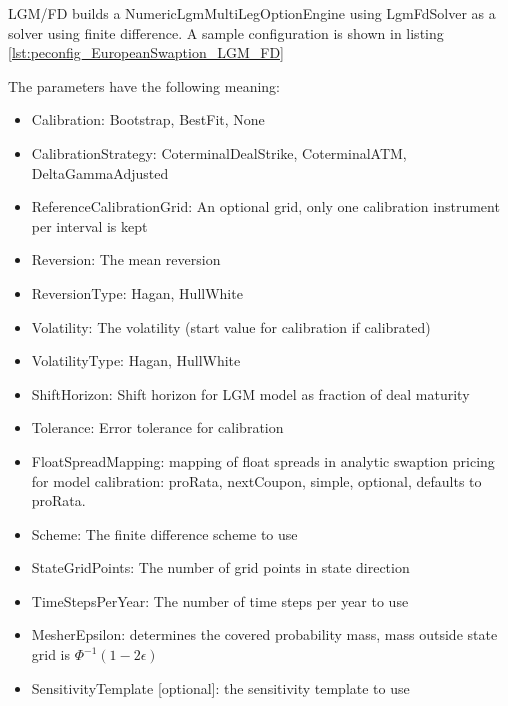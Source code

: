 LGM/FD builds a NumericLgmMultiLegOptionEngine using LgmFdSolver as a solver using finite difference. A sample
configuration is shown in listing \ref{lst:peconfig_EuropeanSwaption_LGM_FD}

The parameters have the following meaning:

\begin{itemize}
\item Calibration: Bootstrap, BestFit, None
\item CalibrationStrategy: CoterminalDealStrike, CoterminalATM, DeltaGammaAdjusted
\item ReferenceCalibrationGrid: An optional grid, only one calibration instrument per interval is kept
\item Reversion: The mean reversion
\item ReversionType: Hagan, HullWhite
\item Volatility: The volatility (start value for calibration if calibrated)
\item VolatilityType: Hagan, HullWhite
\item ShiftHorizon: Shift horizon for LGM model as fraction of deal maturity
\item Tolerance: Error tolerance for calibration
\item FloatSpreadMapping: mapping of float spreads in analytic swaption pricing for model calibration: proRata,
  nextCoupon, simple, optional, defaults to proRata.
\item Scheme: The finite difference scheme to use
\item StateGridPoints: The number of grid points in state direction
\item TimeStepsPerYear: The number of time steps per year to use
\item MesherEpsilon: determines the covered probability mass, mass outside state grid is $\Phi^{-1}(1-2\epsilon)$
\item SensitivityTemplate [optional]: the sensitivity template to use
\end{itemize}

